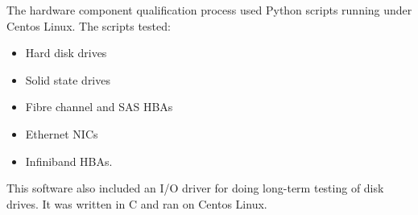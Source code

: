 \documentclass[10pt,a4paper,sans]{moderncv}
\begin{document}
{The hardware component qualification process used Python scripts running under Centos Linux.
                          The scripts tested:
                          \begin{itemize}
                              \item Hard disk drives
                              \item Solid state drives
                              \item Fibre channel and SAS HBAs
                              \item Ethernet NICs
                              \item Infiniband HBAs.
                          \end{itemize}
                          This software also included an I/O driver for doing long-term testing of disk drives. It was written in C
                          and ran on Centos Linux.}
\end{document}
